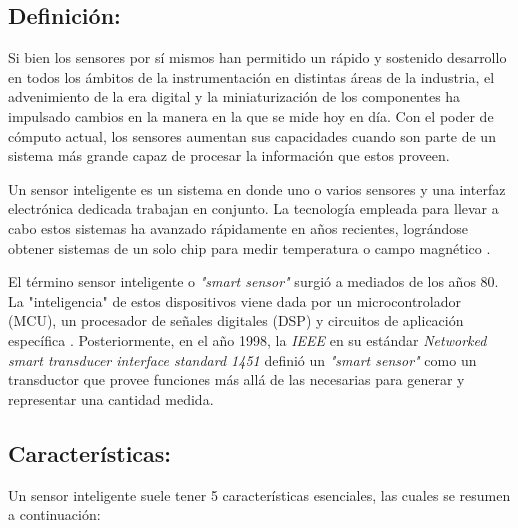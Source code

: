 \subsection{Definición:}

Si bien los sensores por sí mismos han permitido un rápido y sostenido desarrollo en todos los ámbitos de la instrumentación en distintas áreas de la industria, el advenimiento de la era digital y la miniaturización de los componentes ha impulsado cambios en la manera en la que se mide hoy en día. Con el poder de cómputo actual, los sensores aumentan sus capacidades cuando son parte de un sistema más grande capaz de procesar la información que estos proveen.



Un sensor inteligente es un sistema en donde uno o varios sensores y una interfaz electrónica dedicada trabajan en conjunto. La tecnología empleada para llevar a cabo estos sistemas ha avanzado rápidamente en años recientes, lográndose obtener sistemas de un solo chip para medir temperatura o campo magnético \citep{nagayama2007structural}.


El término sensor inteligente o \textit{"smart sensor"} surgió a mediados de los años 80. La "inteligencia" de estos dispositivos viene dada por un microcontrolador (MCU), un procesador de señales digitales (DSP) y circuitos de aplicación específica \citep{frank2002understanding}. Posteriormente, en el año 1998, la \textit{IEEE} en su estándar \textit{Networked smart transducer interface standard 1451} definió un \textit{"smart sensor"} como un transductor que provee funciones más allá de las necesarias para generar y representar una cantidad medida.


\subsection{Características:}

Un sensor inteligente suele tener 5 características esenciales, las cuales se resumen a continuación:

